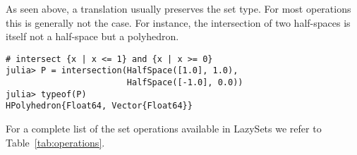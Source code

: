 As seen above, a translation usually preserves the set type.
For most operations this is generally not the case.
For instance, the intersection of two half-spaces is itself not a half-space but a polyhedron.

\begin{minipage}{\linewidth}
\vspace{-\abovedisplayskip}
\begin{lstlisting}
# intersect {x | x <= 1} and {x | x >= 0}
julia> P = intersection(HalfSpace([1.0], 1.0),
                        HalfSpace([-1.0], 0.0))
julia> typeof(P)
HPolyhedron{Float64, Vector{Float64}}
\end{lstlisting}
\end{minipage}

For a complete list of the set operations available in LazySets we refer to Table~\ref{tab:operations}.
